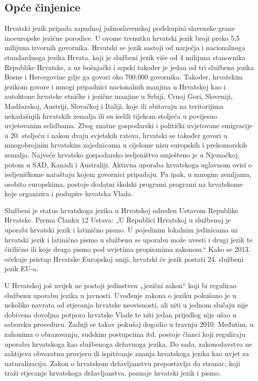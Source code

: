\begin{multicols}{2}

\subsection{Opće činjenice}

Hrvatski jezik pripada zapadnoj južnoslavenskoj podskupini slavenske grane inoeuropske jezične porodice. U ovome trenutku hrvatski jezik broji preko 5,5 milijuna izvornih govornika. Hrvatski se jezik sastoji od narječja i nacionalnoga standardnoga jezika Hrvata, koji je službeni jezik više od 4 milijuna stanovnika Republike Hrvatske, a uz bošnjački i srpski također je jedan od tri službena jezika Bosne i Hercegovine gdje ga govori oko 700.000 govornika. Također, hrvatskim jezikom govore i mnogi pripadnici nacionalnih manjina u Hrvatskoj kao i autohtone hrvatske etničke i jezične manjine u Srbiji, Crnoj Gori, Sloveniji, Madžarskoj, Austriji, Slovačkoj i Italiji, koje ili obitavaju na teritorijima nekadašnjih hrvatskih zemalja ili su iselili tijekom stoljeća u povijesno uvjetovanim selidbama. Zbog znatne gospodarski i politički uvjetovane emigracije u 20. stoljeću i nakon dvaju svjetskih ratova, hrvatski se također govori u mnogobrojnim hrvatskim zajednicama u cijelome nizu europskih i prekomorskih zemalja. Najveće hrvatsko gospodarsko iseljeništvo smješteno je u Njemačkoj, potom u SAD, Kanadi i Australiji. Aktivna uporaba hrvatskoga uglavnom ovisi o iseljeničkome naraštaju kojem govornici pripadaju. Pa ipak, u mnogim zemljama, osobito europskima, postoje dodatni školski programi programi na hrvatskome koje organizira i podupire hrvatska Vlada.

Službeni je status hrvatskoga jezika u Hrvatskoj određen Ustavom Republike Hrvatske. Prema Članku 12 Ustava: „U Republici Hrvatskoj u službenoj je uporabi hrvatski jezik i latinično pismo. U pojedinim lokalnim jedinicama uz hrvatski jezik i latinično pismo u službenu se uporabu može uvesti i drugi jezik te ćirilićno ili koje drugo pismo pod uvjetima propisanima zakonom.“ Kako se 2013. očekuje pristup Hrvatske Europskoj uniji, hrvatski će jezik postati 24. službeni jezik EU-a.

U Hrvatskoj još uvijek ne postoji jedinstven „jezični zakon“ koji bi regulirao službenu uporabu jezika u javnosti. Uvođenje zakona o jeziku pokušano je u nekoliko navrata od stjecanja hrvatske neovisnosti, ali niti u jednom slučaju nije dobivena dovoljna potpora hrvatske Vlade te niti jedan prijedlog nije ušao u saborsku proceduru. Zadnji se takav pokušaj dogodio u travnju 2010. Međutim, u zakonima o obrazovanju, sudskim postupcima itd. postoje članci koji reguliraju uporabu hrvatskoga kao službenoga državnoga jezika. Do sada, zakonodavstvo ne zahtijeva obvezatnu provjeru ili ispitivanje znanja hrvatskoga jezika kao uvjet za naturalizaciju. Zakon o hrvatskom državljanstvu \cite{str6} prepostavlja da stranac, koji traži stjecanje hrvatskoga državljanstva, poznaje hrvatski jezik i pismo.


\end{multicols}
